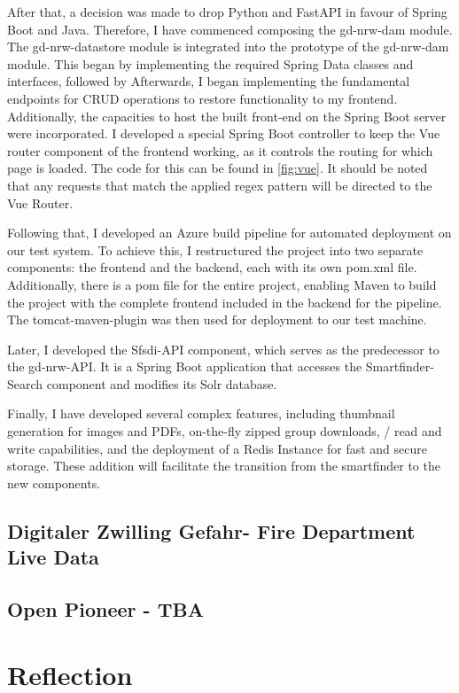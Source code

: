 \documentclass[11pt, titlepage, a4paper]{article}
\begin{document}
After that, a decision was made to drop Python and FastAPI in favour of Spring Boot and Java. Therefore, I have commenced composing the gd-nrw-dam module. The gd-nrw-datastore module is integrated into the prototype of the gd-nrw-dam module. This began by implementing the required Spring Data classes and interfaces, followed by Afterwards, I began implementing the fundamental endpoints for CRUD operations to restore functionality to my frontend. Additionally, the capacities to host the built front-end on the Spring Boot server were incorporated. I developed a special Spring Boot controller to keep the Vue router component of the frontend working, as it controls the routing for which page is loaded. The code for this can be found in \ref{fig:vue}. It should be noted that any requests that match the applied regex pattern will be directed to the Vue Router.

Following that, I developed an Azure build pipeline for automated deployment on our test system.  To achieve this, I restructured the project into two separate components: the frontend and the backend, each with its own pom.xml file. Additionally, there is a pom file for the entire project, enabling Maven to build the project with the complete frontend included in the backend for the pipeline. The tomcat-maven-plugin was then used for deployment to our test machine.

Later, I developed the Sfsdi-API component, which serves as the predecessor to the gd-nrw-API. It is a Spring Boot application that accesses the Smartfinder-Search component and modifies its Solr database.

Finally, I have developed several complex features, including thumbnail generation for images and PDFs, on-the-fly zipped group downloads, / read and write capabilities, and the deployment of a Redis Instance for fast and secure storage. These addition will facilitate the transition from the smartfinder to the new components.



\subsection{Digitaler Zwilling Gefahr- Fire Department Live Data}
\subsection{Open Pioneer - TBA}
\section{Reflection}

\clearpage
\printglossary[type=\acronymtype]
\printglossary
\clearpage
\printbibliography
\end{document}
